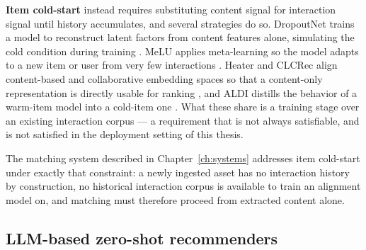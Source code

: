 \textbf{Item cold-start} instead requires substituting content signal for interaction signal until history accumulates, and several strategies do so. DropoutNet trains a model to reconstruct latent factors from content features alone, simulating the cold condition during training \citep{volkovs2017dropoutnet}. MeLU applies meta-learning so the model adapts to a new item or user from very few interactions \citep{lee2019melu}. Heater and CLCRec align content-based and collaborative embedding spaces so that a content-only representation is directly usable for ranking \citep{zhu2020recommendation,wei2021contrastive}, and ALDI distills the behavior of a warm-item model into a cold-item one \citep{huang2023aligning}. What these share is a training stage over an existing interaction corpus — a requirement that is not always satisfiable, and is not satisfied in the deployment setting of this thesis.

The matching system described in Chapter~\ref{ch:systems} addresses item cold-start under exactly that constraint: a newly ingested asset has no interaction history by construction, no historical interaction corpus is available to train an alignment model on, and matching must therefore proceed from extracted content alone.

\subsection{LLM-based zero-shot recommenders}
\label{sec:llm-zeroshot-rec}


